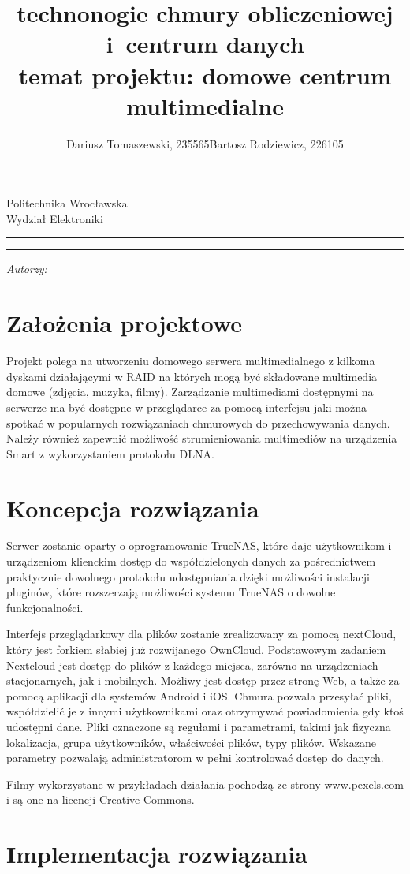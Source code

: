 \documentclass[12pt,a4paper]{article}
\author{Dariusz Tomaszewski, 235565\newline Bartosz Rodziewicz, 226105}
\title{technonogie chmury obliczeniowej i~centrum danych\\
\normalsize{temat projektu: domowe centrum multimedialne}}
\makeatletter
\newcommand{\<}{\langle}
\renewcommand{\>}{\rangle}
\theoremstyle{definition}
\newcommand{\linia}{\rule{\linewidth}{0.4mm}}
\renewcommand{\maketitle}{\begin{titlepage}
    \vspace*{1cm}
    \begin{center}\small
    Politechnika Wrocławska\\
    Wydział Elektroniki
    \end{center}
    \vspace{3cm}
    \noindent\linia
    \begin{center}
      \LARGE \textsc{\@title}
         \end{center}
     \linia
    \vspace{0.5cm}
    \begin{flushright}
    \begin{minipage}{7cm}
    \textit{\small Autorzy:}\\
    \normalsize \textsc{\@author} \par
    \end{minipage}
    \vspace{5cm}

     {}
     \end{flushright}
    \vspace*{\stretch{6}}
    \begin{center}
    \@date
    \end{center}
  \end{titlepage}%
}
\makeatother
\begin{document}
\maketitle
\tableofcontents
\newpage

\section{Założenia projektowe}

Projekt polega na utworzeniu domowego serwera multimedialnego z kilkoma dyskami działającymi w RAID na których mogą być składowane multimedia domowe (zdjęcia, muzyka, filmy). Zarządzanie multimediami dostępnymi na serwerze ma być dostępne w przeglądarce za pomocą interfejsu jaki można spotkać w popularnych rozwiązaniach chmurowych do przechowywania danych. Należy również zapewnić możliwość strumieniowania multimediów na urządzenia Smart z wykorzystaniem protokołu DLNA.

\section{Koncepcja rozwiązania}

Serwer zostanie oparty o oprogramowanie TrueNAS, które daje użytkownikom i urządzeniom klienckim dostęp do współdzielonych danych za pośrednictwem praktycznie dowolnego protokołu udostępniania dzięki możliwości instalacji pluginów, które rozszerzają możliwości systemu TrueNAS o dowolne funkcjonalności.

Interfejs przeglądarkowy dla plików zostanie zrealizowany za pomocą nextCloud, który jest forkiem słabiej już rozwijanego OwnCloud. Podstawowym zadaniem Nextcloud jest dostęp do plików z każdego miejsca, zarówno na urządzeniach stacjonarnych, jak i mobilnych. Możliwy jest dostęp przez stronę Web, a także za pomocą aplikacji dla systemów Android i iOS. Chmura pozwala przesyłać pliki, współdzielić je z innymi użytkownikami oraz otrzymywać powiadomienia gdy ktoś udostępni dane. Pliki oznaczone są regułami i parametrami, takimi jak fizyczna lokalizacja, grupa użytkowników, właściwości plików, typy plików. Wskazane parametry pozwalają administratorom w pełni kontrolować dostęp do danych.

Filmy wykorzystane w przykładach działania pochodzą ze strony \url{www.pexels.com} i są one na licencji Creative Commons.

\section{Implementacja rozwiązania}
\end{document}

